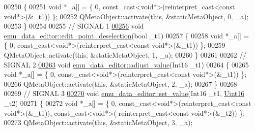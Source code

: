\begin{DoxyCode}
00250 \{
00251     \textcolor{keywordtype}{void} *\_a[] = \{ 0, \textcolor{keyword}{const\_cast<}\textcolor{keywordtype}{void}*\textcolor{keyword}{>}(\textcolor{keyword}{reinterpret\_cast<}\textcolor{keyword}{const }\textcolor{keywordtype}{void}*\textcolor{keyword}{>}(&\_t1)) \};
00252     QMetaObject::activate(\textcolor{keyword}{this}, &staticMetaObject, 0, \_a);
00253 \}
00254 
00255 \textcolor{comment}{// SIGNAL 1}
\hypertarget{a00014_source_l00256}{}\hyperlink{a00004_a2b9629d20c2b97c01bf8486c89fd0148}{00256} \textcolor{keywordtype}{void} \hyperlink{a00004_a2b9629d20c2b97c01bf8486c89fd0148}{emu\_data\_editor::edit\_point\_deselection}(\textcolor{keywordtype}{bool} \_t1)
00257 \{
00258     \textcolor{keywordtype}{void} *\_a[] = \{ 0, \textcolor{keyword}{const\_cast<}\textcolor{keywordtype}{void}*\textcolor{keyword}{>}(\textcolor{keyword}{reinterpret\_cast<}\textcolor{keyword}{const }\textcolor{keywordtype}{void}*\textcolor{keyword}{>}(&\_t1)) \};
00259     QMetaObject::activate(\textcolor{keyword}{this}, &staticMetaObject, 1, \_a);
00260 \}
00261 
00262 \textcolor{comment}{// SIGNAL 2}
\hypertarget{a00014_source_l00263}{}\hyperlink{a00004_a74d292de22b341313df1852cb1033704}{00263} \textcolor{keywordtype}{void} \hyperlink{a00004_a74d292de22b341313df1852cb1033704}{emu\_data\_editor::adjust\_value}(Int16 \_t1)
00264 \{
00265     \textcolor{keywordtype}{void} *\_a[] = \{ 0, \textcolor{keyword}{const\_cast<}\textcolor{keywordtype}{void}*\textcolor{keyword}{>}(\textcolor{keyword}{reinterpret\_cast<}\textcolor{keyword}{const }\textcolor{keywordtype}{void}*\textcolor{keyword}{>}(&\_t1)) \};
00266     QMetaObject::activate(\textcolor{keyword}{this}, &staticMetaObject, 2, \_a);
00267 \}
00268 
00269 \textcolor{comment}{// SIGNAL 3}
\hypertarget{a00014_source_l00270}{}\hyperlink{a00004_a9d26460f253a29dd961b20be0afb5358}{00270} \textcolor{keywordtype}{void} \hyperlink{a00004_a9d26460f253a29dd961b20be0afb5358}{emu\_data\_editor::set\_value}(Int16 \_t1, \hyperlink{a00001_aae7407b021d43f7193a81a58cfb3e297}{Uint16} \_t2)
00271 \{
00272     \textcolor{keywordtype}{void} *\_a[] = \{ 0, \textcolor{keyword}{const\_cast<}\textcolor{keywordtype}{void}*\textcolor{keyword}{>}(\textcolor{keyword}{reinterpret\_cast<}\textcolor{keyword}{const }\textcolor{keywordtype}{void}*\textcolor{keyword}{>}(&\_t1)), \textcolor{keyword}{const\_cast<}\textcolor{keywordtype}{void}*\textcolor{keyword}{>}(\textcolor{keyword}{
      reinterpret\_cast<}\textcolor{keyword}{const }\textcolor{keywordtype}{void}*\textcolor{keyword}{>}(&\_t2)) \};
00273     QMetaObject::activate(\textcolor{keyword}{this}, &staticMetaObject, 3, \_a);

\end{DoxyCode}
